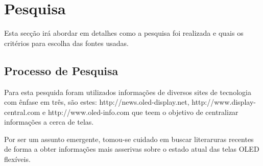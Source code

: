 \chapter{Pesquisa}
\label{cap:pesquisa}

Esta secção irá abordar em detalhes como a pesquisa foi realizada e quais os critérios para escolha das fontes usadas.


\section{Processo de Pesquisa}
\label{sec:processo de pesquisa}

Para esta pesquida foram utilizados informações de diversos sites de tecnologia com ênfase em três, são estes: http://news.oled-display.net, http://www.display-central.com e http://www.oled-info.com que teem o objetivo de centralizar informações a cerca de telas.

Por ser um assunto emergente, tomou-se cuidado em buscar literaruras recentes de forma a obter informações mais asserivas sobre o estado atual das telas OLED flexíveis.